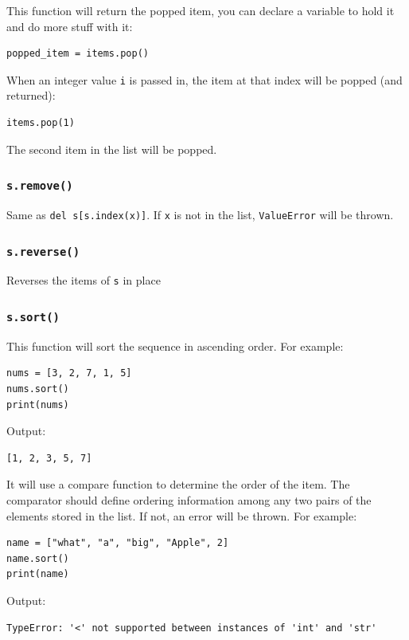 \documentclass[12pt]{book}
\begin{document}
This function will return the popped item, you can declare a variable to hold it and do more stuff with it:
\begin{verbatim}
popped_item = items.pop()
\end{verbatim}

When an integer value \texttt{i} is passed in, the item at that index will be popped (and returned):
\begin{verbatim}
items.pop(1)
\end{verbatim}
The second item in the list will be popped.
\subsubsection{\texttt{s.remove()}}
\label{sec:orgf6303d6}
Same as \texttt{del s[s.index(x)]}. If \texttt{x} is not in the list, \texttt{ValueError} will be thrown.
\subsubsection{\texttt{s.reverse()}}
\label{sec:orge7a073b}
Reverses the items of \texttt{s} in place
\subsubsection{\texttt{s.sort()}}
\label{sec:org4cebb12}
This function will sort the sequence in ascending order. For example:
\begin{verbatim}
nums = [3, 2, 7, 1, 5]
nums.sort()
print(nums)
\end{verbatim}
Output:
\begin{verbatim}
[1, 2, 3, 5, 7]
\end{verbatim}

It will use a compare function to determine the order of the item. The comparator should define ordering information among any two pairs of the elements stored in the list. If not, an error will be thrown. For example:
\begin{verbatim}
name = ["what", "a", "big", "Apple", 2]
name.sort()
print(name)
\end{verbatim}
Output:
\begin{verbatim}
TypeError: '<' not supported between instances of 'int' and 'str'
\end{verbatim}
\end{document}
